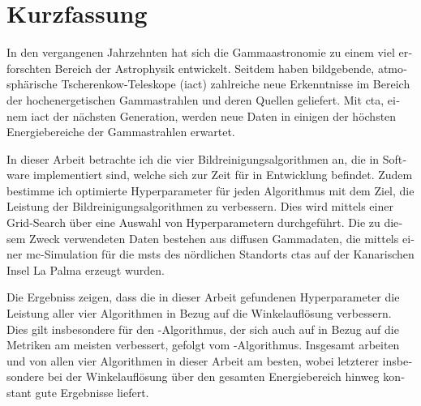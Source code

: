 \section*{Kurzfassung}
\begin{otherlanguage}{ngerman}
In den vergangenen Jahrzehnten hat sich die Gammaastronomie zu einem viel erforschten Bereich der
Astrophysik entwickelt. Seitdem haben bildgebende, atmosphärische Tscherenkow-Teleskope (\gls{iact})
zahlreiche neue Erkenntnisse im Bereich der hochenergetischen Gammastrahlen und deren Quellen geliefert.
Mit \gls{cta}, einem \gls{iact} der nächsten Generation, werden neue Daten in einigen der höchsten
Energiebereiche der Gammastrahlen erwartet.

In dieser Arbeit betrachte ich die vier Bildreinigungsalgorithmen an, die in Software \ctapipe{} implementiert
sind, welche sich zur Zeit für \cta{} in Entwicklung befindet. Zudem bestimme ich optimierte
Hyperparameter für jeden Algorithmus mit dem Ziel, die Leistung der Bildreinigungsalgorithmen zu verbessern.
Dies wird mittels einer Grid-Search über eine Auswahl von Hyperparametern durchgeführt. Die zu diesem
Zweck verwendeten Daten bestehen aus diffusen Gammadaten, die mittels einer \gls{mc}-Simulation für die
\glspl{mst} des nördlichen Standorts \gls{cta}s auf der Kanarischen Insel La Palma erzeugt wurden.

Die Ergebniss zeigen, dass die in dieser Arbeit gefundenen Hyperparameter die Leistung aller vier
Algorithmen in Bezug auf die Winkelauflösung verbessern. Dies gilt insbesondere für den \tcc{}-Algorithmus,
der sich auch auf in Bezug auf die Metriken am meisten verbessert, gefolgt vom \mars{}-Algorithmus.
Insgesamt arbeiten \fact{} und \mars{} von allen vier Algorithmen in dieser Arbeit am besten, wobei
letzterer insbesondere bei der Winkelauflösung über den gesamten Energiebereich hinweg
konstant gute Ergebnisse liefert.
\end{otherlanguage}
\glsresetall
